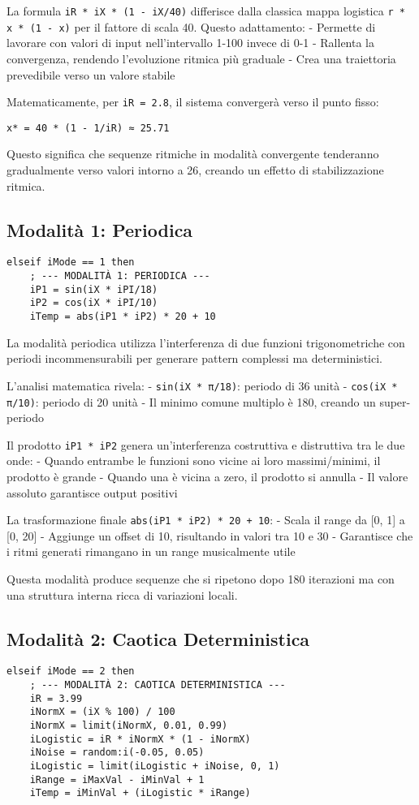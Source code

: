 La formula \texttt{iR * iX * (1 - iX/40)} differisce dalla classica mappa logistica \texttt{r * x * (1 - x)} per il fattore di scala 40. Questo adattamento:
- Permette di lavorare con valori di input nell'intervallo 1-100 invece di 0-1
- Rallenta la convergenza, rendendo l'evoluzione ritmica più graduale
- Crea una traiettoria prevedibile verso un valore stabile

Matematicamente, per \texttt{iR = 2.8}, il sistema convergerà verso il punto fisso:
\begin{lstlisting}
x* = 40 * (1 - 1/iR) ≈ 25.71
\end{lstlisting}

Questo significa che sequenze ritmiche in modalità convergente tenderanno gradualmente verso valori intorno a 26, creando un effetto di stabilizzazione ritmica.
\subsection{Modalità 1: Periodica}
\begin{lstlisting}[language=Csound]
elseif iMode == 1 then
    ; --- MODALITÀ 1: PERIODICA ---
    iP1 = sin(iX * iPI/18)
    iP2 = cos(iX * iPI/10)
    iTemp = abs(iP1 * iP2) * 20 + 10
\end{lstlisting}

La modalità periodica utilizza l'interferenza di due funzioni trigonometriche con periodi incommensurabili per generare pattern complessi ma deterministici.

L'analisi matematica rivela:
- \texttt{sin(iX * π/18)}: periodo di 36 unità
- \texttt{cos(iX * π/10)}: periodo di 20 unità
- Il minimo comune multiplo è 180, creando un super-periodo

Il prodotto \texttt{iP1 * iP2} genera un'interferenza costruttiva e distruttiva tra le due onde:
- Quando entrambe le funzioni sono vicine ai loro massimi/minimi, il prodotto è grande
- Quando una è vicina a zero, il prodotto si annulla
- Il valore assoluto garantisce output positivi

La trasformazione finale \texttt{abs(iP1 * iP2) * 20 + 10}:
- Scala il range da [0, 1] a [0, 20]
- Aggiunge un offset di 10, risultando in valori tra 10 e 30
- Garantisce che i ritmi generati rimangano in un range musicalmente utile

Questa modalità produce sequenze che si ripetono dopo 180 iterazioni ma con una struttura interna ricca di variazioni locali.
\subsection{Modalità 2: Caotica Deterministica}
\begin{lstlisting}[language=Csound]
elseif iMode == 2 then
    ; --- MODALITÀ 2: CAOTICA DETERMINISTICA ---
    iR = 3.99
    iNormX = (iX % 100) / 100
    iNormX = limit(iNormX, 0.01, 0.99)
    iLogistic = iR * iNormX * (1 - iNormX)
    iNoise = random:i(-0.05, 0.05)
    iLogistic = limit(iLogistic + iNoise, 0, 1)
    iRange = iMaxVal - iMinVal + 1
    iTemp = iMinVal + (iLogistic * iRange)
\end{lstlisting}

